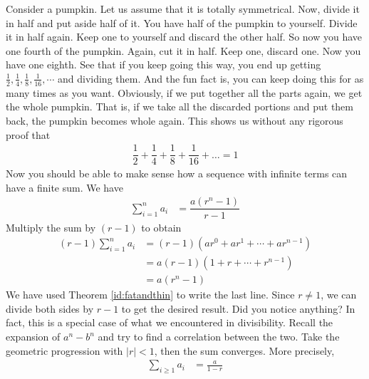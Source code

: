 Consider a pumpkin. Let us assume that it is totally symmetrical. Now, divide it in half and put aside half of it. You have half of the pumpkin to yourself. Divide it in half again. Keep one to yourself and discard the other half. So now you have one fourth of the pumpkin. Again, cut it in half. Keep one, discard one. Now you have one eighth. See that if you keep going this way, you end up getting $\frac{1}{2},\frac{1}{4},\frac{1}{8},\frac{1}{16},\cdots$ and dividing them. And the fun fact is, you can keep doing this for as many times as you want. Obviously, if we put together all the parts again, we get the whole pumpkin. That is, if we take all the discarded portions and put them back, the pumpkin becomes whole again. This shows us without any rigorous proof that
	\begin{align*}
		\dfrac{1}{2}+\dfrac{1}{4}+\dfrac{1}{8}+\dfrac{1}{16}+\ldots=1
	\end{align*}
Now you should be able to make sense how a sequence with infinite terms can have a finite sum. We have
	\begin{align*}
		\sum_{i=1}^{n} a_i &= \dfrac{a \left(r^n-1\right)}{r-1}
	\end{align*}
Multiply the sum by $(r-1)$ to obtain
	\begin{align*}
		(r-1)\sum_{i=1}^{n} a_i &= (r-1)(ar^0 + ar^1 + \cdots + ar^{n-1})\\
								&= a(r-1)(1+r+ \cdots + r^{n-1})\\
								&= a(r^n -1)
	\end{align*}
We have used Theorem \ref{id:fatandthin} to write the last line. Since $r \neq 1$, we can divide both sides by $r-1$ to get the desired result. Did you notice anything? In fact, this is a special case of what we encountered in divisibility. Recall the expansion of $a^n-b^n$ and try to find a correlation between the two. Take the geometric progression with $|r|<1$, then the sum converges. More precisely,
	\begin{align*}
		\sum_{i\geq1} a_i &= \frac{a}{1-r}
	\end{align*}

